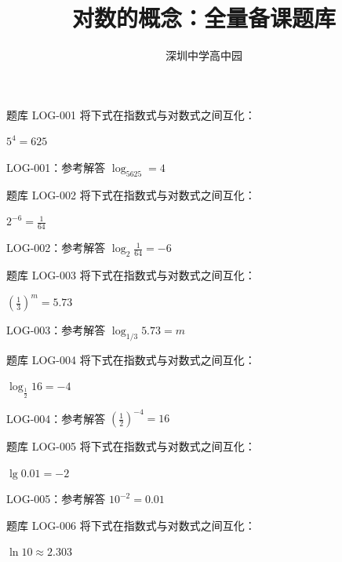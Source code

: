 \documentclass[aspectratio=169,10pt]{beamer}
\author{深圳中学高中园}\date{}
\title{对数的概念：全量备课题库}
\begin{document}
\campusmaketitle
\begin{campuspractice}{题库 LOG-001}
将下式在指数式与对数式之间互化：\par
$5^4=625$
\end{campuspractice}

\ifdefined\TeacherEdition
\begin{frame}[t]{LOG-001：参考解答}
$\log_5625=4$
\end{frame}
\fi

\begin{campuspractice}{题库 LOG-002}
将下式在指数式与对数式之间互化：\par
$2^{-6}=\frac{1}{64}$
\end{campuspractice}

\ifdefined\TeacherEdition
\begin{frame}[t]{LOG-002：参考解答}
$\log_2\frac1{64}=-6$
\end{frame}
\fi

\begin{campuspractice}{题库 LOG-003}
将下式在指数式与对数式之间互化：\par
$(\frac{1}{3})^m=5.73$
\end{campuspractice}

\ifdefined\TeacherEdition
\begin{frame}[t]{LOG-003：参考解答}
$\log_{1/3}5.73=m$
\end{frame}
\fi

\begin{campuspractice}{题库 LOG-004}
将下式在指数式与对数式之间互化：\par
$\log_{\frac{1}{2}}16=-4$
\end{campuspractice}

\ifdefined\TeacherEdition
\begin{frame}[t]{LOG-004：参考解答}
$(\frac12)^{-4}=16$
\end{frame}
\fi

\begin{campuspractice}{题库 LOG-005}
将下式在指数式与对数式之间互化：\par
$\lg0.01=-2$
\end{campuspractice}

\ifdefined\TeacherEdition
\begin{frame}[t]{LOG-005：参考解答}
$10^{-2}=0.01$
\end{frame}
\fi

\begin{campuspractice}{题库 LOG-006}
将下式在指数式与对数式之间互化：\par
$\ln10\approx2.303$
\end{campuspractice}
\end{document}
